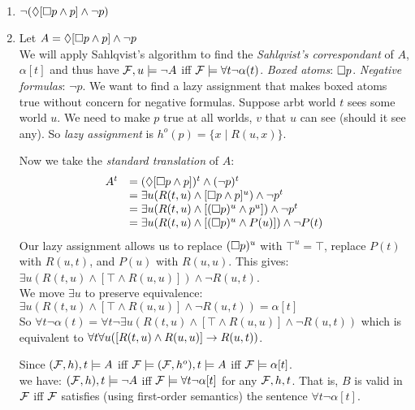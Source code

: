 \documentclass[a4paper, draft, 12pt]{article}
\begin{document}
\begin{enumerate}
\begin{enumerate}
\begin{enumerate}
  \item
  $\neg (\Diamond [\square p \wedge p] \wedge \neg p)$
  \item
  Let $A = \Diamond [\square p \wedge p] \wedge \neg p$ \\
  We will apply Sahlqvist's algorithm to find the \textit{Sahlqvist's correspondant} of $A$, $\alpha[t]$ and 
  thus have $\mathcal{F}, u \models \neg A$ iff $\mathcal{F} \models \forall t \neg \alpha(t)$. 
  \textit{Boxed atoms}: $\square p$.  \textit{Negative formulas}: $\neg p$. We want to find a lazy assignment that 
  makes boxed atoms true without concern for negative formulas. 
  Suppose arbt world $t$ sees some world $u$. We need to make 
  $p$ true at all worlds, $v$ that $u$ can see (should it see any). 
  So \textit{lazy assignment} is $h^{o}(p) = \{x \;|\; R(u,x)\}$.

  Now we take the \textit{standard translation} of $A$:
  $$ 
  \begin{array}{ll}
    A^{t} &= (\Diamond [\square p \wedge p])^t \wedge (\neg p)^t  \\
          &= \exists u (R(t,u) \wedge [\square p \wedge p]^u) \wedge \neg p^t  \\
          &= \exists u (R(t,u) \wedge [(\square p)^u \wedge p^u]) \wedge \neg p^t  \\
          &= \exists u (R(t,u) \wedge [(\square p)^u \wedge P(u)]) \wedge \neg P(t)  \\
  \end{array}
  $$
  Our lazy assignment allows us to replace $(\square p)^u$ with $\top^u = \top$, 
  replace $P(t)$ with $R(u, t)$, and $P(u)$ with $R(u, u)$. This gives:\\
  $\exists u (R(t,u) \wedge [\top \wedge R(u, u)]) \wedge \neg R(u, t)$. \\
  We move $\exists u$ to preserve equivalence:\\
  $\exists u (R(t,u) \wedge [\top \wedge R(u, u)] \wedge \neg R(u, t)) = \alpha[t]$\\
  So $\forall t \neg \alpha(t) = \forall t \neg \exists u (R(t,u) \wedge [\top \wedge R(u, u)] \wedge \neg R(u, t))$
  which is equivalent to $\forall t \forall u ([R(t,u) \wedge R(u,u)] \rightarrow R(u,t))$. 

  Since $(\mathcal{F}, h), t \models A$ iff $\mathcal{F} \models (\mathcal{F}, h^{o}), t \models A$ iff $\mathcal{F} \models \alpha[t]$. \\
  we have: $(\mathcal{F}, h), t \models \neg A$ iff $\mathcal{F} \models \forall t \neg \alpha[t]$ for any $\mathcal{F}, h, t$. 
  That is, $B$ is valid in $\mathcal{F}$ iff $\mathcal{F}$ satisfies (using first-order semantics) the sentence $\forall t \neg \alpha[t]$.


\end{enumerate}
\end{enumerate}
\end{enumerate}
\end{document}
